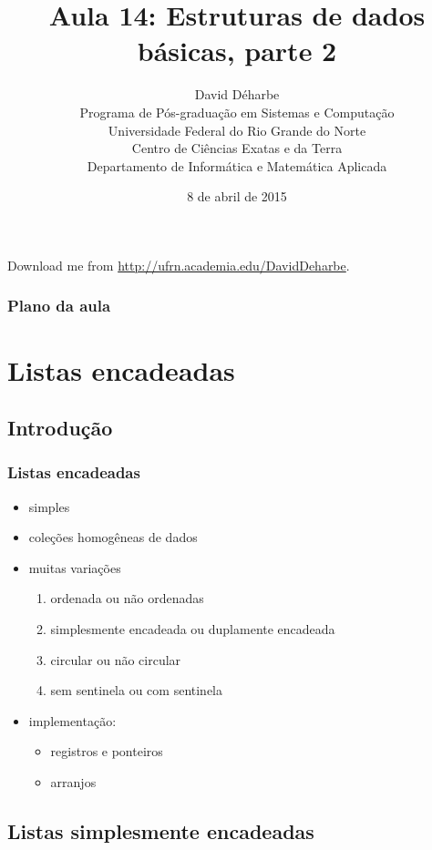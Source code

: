 \documentclass{beamer}
\title{Aula 14: Estruturas de dados básicas, parte 2}
\author{David Déharbe \\
  Programa de Pós-graduação em Sistemas e Computação \\
  Universidade Federal do Rio Grande do Norte \\
  Centro de Ciências Exatas e da Terra \\
  Departamento de Informática e Matemática Aplicada}
\date{8 de abril de 2015}
\begin{document}
\begin{frame}
  \titlepage
  Download me from \url{http://ufrn.academia.edu/DavidDeharbe}.
\end{frame}

\begin{frame}
  \frametitle{Plano da aula}
  \tableofcontents
\end{frame}

\section{Listas encadeadas}

\subsection{Introdução}

\begin{frame}
  \frametitle{Listas encadeadas}

  \begin{itemize}
  \item simples
  \item coleções homogêneas de dados
  \item muitas variações
    \begin{enumerate}
      \item ordenada ou não ordenadas
      \item simplesmente encadeada ou duplamente encadeada
      \item circular ou não circular
      \item sem sentinela ou com sentinela
    \end{enumerate}
  \item implementação:
    \begin{itemize}
      \item registros e ponteiros
      \item arranjos
    \end{itemize}
  \end{itemize}

\end{frame}

\subsection{Listas simplesmente encadeadas}
\end{document}

